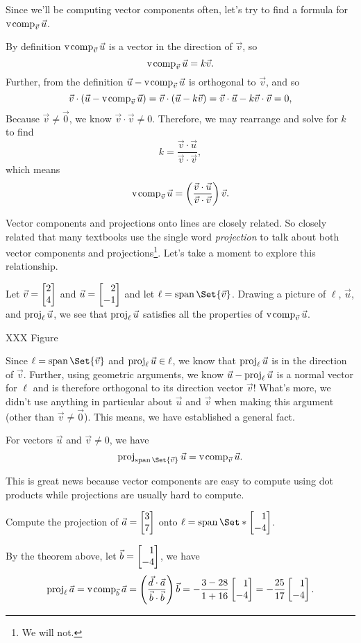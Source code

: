 Since we'll be computing vector components often, let's try to find a formula for $\operatorname{v\hspace{1pt}comp}_{\vec v}\vec u$.

By definition $\operatorname{v\hspace{1pt}comp}_{\vec v}\vec u$ is a vector in the direction of $\vec v$, so
\[
	\operatorname{v\hspace{1pt}comp}_{\vec v}\vec u = k\vec v.
\]
Further, from the definition $\vec u-\operatorname{v\hspace{1pt}comp}_{\vec v}\vec u$ is orthogonal to $\vec v$, and so
\[
	\vec v\cdot (\vec u-\operatorname{v\hspace{1pt}comp}_{\vec v}\vec u) = \vec v\cdot (\vec u-k\vec v)=\vec v\cdot \vec u-k\vec v\cdot \vec v=0,
\]
Because $\vec v\neq \vec 0$, we know $\vec v\cdot \vec v\neq 0$. Therefore, we may rearrange and solve for $k$ to find
\[
	k=\frac{\vec v\cdot \vec u}{\vec v\cdot \vec v},
\]
which means
\[
	\operatorname{v\hspace{1pt}comp}_{\vec v}\vec u = \left(\frac{\vec v\cdot \vec u}{\vec v\cdot \vec v}\right)\vec v.
\]


Vector components and projections onto lines are closely related. So closely related that many textbooks
use the single word \emph{projection} to talk about both vector components and projections\footnote{ We will not.}. Let's take a moment
to explore this relationship.

Let $\vec v=\mat{2\\4}$ and $\vec u=\mat{2\\-1}$ and let $\ell=\Span\Set{\vec v}$. Drawing a picture of
$\ell$, $\vec u$, and $\operatorname{proj}_\ell\vec u$, we see that $\operatorname{proj}_\ell\vec u$ satisfies all the properties
of $\operatorname{v\hspace{1pt}comp}_{\vec v}\vec u$.

XXX Figure

Since $\ell=\Span\Set{\vec v}$ and $\operatorname{proj}_\ell\vec u\in\ell$, we know that $\operatorname{proj}_\ell\vec u$ is in the direction
of $\vec v$. Further, using geometric arguments, we know $\vec u-\operatorname{proj}_\ell\vec u$ is a normal vector for $\ell$
and is therefore orthogonal to its direction vector $\vec v$! What's more, we didn't
use anything in particular about $\vec u$ and $\vec v$ when making this argument (other than $\vec v\neq \vec 0$). This means,
we have established a general fact. 

\begin{theorem}
	For vectors $\vec u$ and $\vec v\neq 0$, we have
	\[
		\Proj_{\Span\Set{\vec v}}\vec u=\Vcomp_{\vec v}\vec u.
	\]
\end{theorem}

This is great news because vector components are easy to compute using dot products while projections are usually hard to compute.

\begin{example}
	Compute the projection of $\vec a=\mat{3\\7}$ onto $\ell=\Span\Set*{\mat{1\\-4}}$.

	By the theorem above, let $\vec b = \mat{1\\-4}$, we have
	\[
	    \Proj_\ell \vec a = \Vcomp_{\vec b} \vec a = \left(\frac{\vec d\cdot \vec a}{\vec b\cdot \vec b}\right)\vec b = -\frac{3-28}{1+16}\mat{1\\-4}=-\frac{25}{17}\mat{1\\-4}.
	\]
\end{example}

